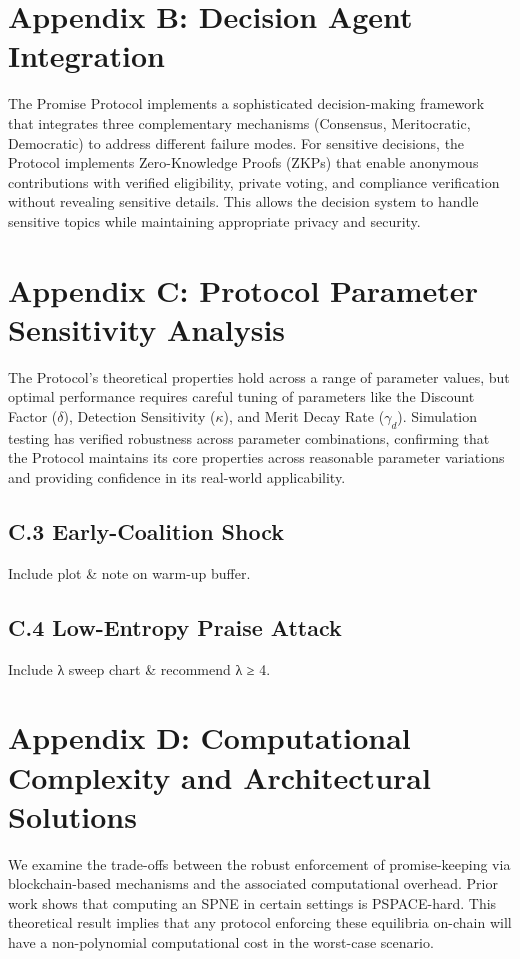 \documentclass[11pt]{article}
\begin{document}
\section{Appendix B: Decision Agent Integration}
\label{sec:org92ab048}
The Promise Protocol implements a sophisticated decision-making framework that integrates three complementary mechanisms (Consensus, Meritocratic, Democratic) to address different failure modes. For sensitive decisions, the Protocol implements Zero-Knowledge Proofs (ZKPs) that enable anonymous contributions with verified eligibility, private voting, and compliance verification without revealing sensitive details. This allows the decision system to handle sensitive topics while maintaining appropriate privacy and security.
\section{Appendix C: Protocol Parameter Sensitivity Analysis}
\label{sec:org354d81c}
The Protocol's theoretical properties hold across a range of parameter values, but optimal performance requires careful tuning of parameters like the Discount Factor (\(\delta\)), Detection Sensitivity (\(\kappa\)), and Merit Decay Rate (\(\gamma_d\)). Simulation testing has verified robustness across parameter combinations, confirming that the Protocol maintains its core properties across reasonable parameter variations and providing confidence in its real-world applicability.
\subsection{C.3 Early-Coalition Shock}
\label{sec:org36bc286}
Include plot \& note on warm-up buffer.
\subsection{C.4 Low-Entropy Praise Attack}
\label{sec:org5e293c2}
Include λ sweep chart \& recommend λ ≥ 4.
\section{Appendix D: Computational Complexity and Architectural Solutions}
\label{sec:orgc2f3c1b}
We examine the trade-offs between the robust enforcement of promise-keeping via blockchain-based mechanisms and the associated computational overhead. Prior work shows that computing an SPNE in certain settings is PSPACE-hard. This theoretical result implies that any protocol enforcing these equilibria on-chain will have a non-polynomial computational cost in the worst-case scenario.
\end{document}
